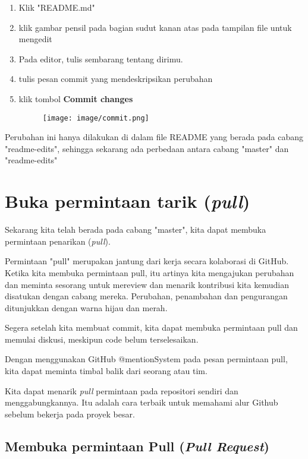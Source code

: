 \documentclass[12pt,a4paper]{article}
\begin{document}
\begin{enumerate}
\item Klik "README.md"
\item klik gambar pensil pada bagian sudut kanan atas pada tampilan file untuk mengedit
\item Pada editor, tulis sembarang tentang dirimu.
\item tulis pesan commit yang mendeskripsikan perubahan
\item klik tombol \textbf{Commit changes}
\begin{figure}[h!]
\texttt{[image: image/commit.png]} 
\end{figure}
\end{enumerate}
Perubahan ini hanya dilakukan di dalam file README yang berada pada cabang "readme-edits", sehingga sekarang ada perbedaan antara cabang "master" dan "readme-edits"

\section{Buka permintaan tarik (\textit{pull})}
Sekarang kita telah berada pada cabang "master", kita dapat membuka permintaan penarikan (\textit{pull}).

Permintaan "pull" merupakan jantung dari kerja secara kolaborasi di GitHub. Ketika kita membuka permintaan pull, itu artinya kita mengajukan perubahan dan meminta sesorang untuk mereview dan menarik kontribusi kita kemudian disatukan dengan cabang mereka. Perubahan, penambahan dan pengurangan ditunjukkan dengan warna hijau dan merah.

Segera setelah kita membuat commit, kita dapat membuka permintaan pull dan memulai diskusi, meskipun code belum terselesaikan.

Dengan menggunakan GitHub @mentionSystem pada pesan permintaan pull, kita dapat meminta timbal balik dari seorang atau tim.

Kita dapat menarik \textit{pull} permintaan pada repositori sendiri dan menggabungkannya. Itu adalah cara terbaik untuk memahami alur Github sebelum bekerja pada proyek besar.

\subsection*{Membuka permintaan Pull (\textit{Pull Request})}
\end{document}
